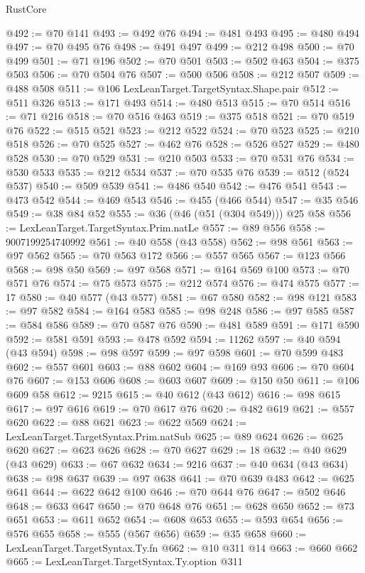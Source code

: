\begin{lexlean}{RustCore}
\begin{coremodule}
@492 := @70 @141
@493 := @492 @76
@494 := @481 @493
@495 := @480 @494
@497 := @70 @495 @76
@498 := @491 @497
@499 := @212 @498
@500 := @70 @499
@501 := @71 @196
@502 := @70 @501
@503 := @502 @463
@504 := @375 @503
@506 := @70 @504 @76
@507 := @500 @506
@508 := @212 @507
@509 := @488 @508
@511 := @106 LexLeanTarget.TargetSyntax.Shape.pair
@512 := @511 @326
@513 := @171 @493
@514 := @480 @513
@515 := @70 @514
@516 := @71 @216
@518 := @70 @516 @463
@519 := @375 @518
@521 := @70 @519 @76
@522 := @515 @521
@523 := @212 @522
@524 := @70 @523
@525 := @210 @518
@526 := @70 @525
@527 := @462 @76
@528 := @526 @527
@529 := @480 @528
@530 := @70 @529
@531 := @210 @503
@533 := @70 @531 @76
@534 := @530 @533
@535 := @212 @534
@537 := @70 @535 @76
@539 := @512 (@524 @537)
@540 := @509 @539
@541 := @486 @540
@542 := @476 @541
@543 := @473 @542
@544 := @469 @543
@546 := @455 (@466 @544)
@547 := @35 @546
@549 := @38 @84 @52
@555 := @36 (@46 (@51 (@304 @549))) @25 @58
@556 := LexLeanTarget.TargetSyntax.Prim.natLe
@557 := @89 @556
@558 := 9007199254740992
@561 := @40 @558 (@43 @558)
@562 := @98 @561
@563 := @97 @562
@565 := @70 @563 @172
@566 := @557 @565
@567 := @123 @566
@568 := @98 @50
@569 := @97 @568
@571 := @164 @569 @100
@573 := @70 @571 @76
@574 := @75 @573
@575 := @212 @574
@576 := @474 @575
@577 := 17
@580 := @40 @577 (@43 @577)
@581 := @67 @580
@582 := @98 @121
@583 := @97 @582
@584 := @164 @583
@585 := @98 @248
@586 := @97 @585
@587 := @584 @586
@589 := @70 @587 @76
@590 := @481 @589
@591 := @171 @590
@592 := @581 @591
@593 := @478 @592
@594 := 11262
@597 := @40 @594 (@43 @594)
@598 := @98 @597
@599 := @97 @598
@601 := @70 @599 @483
@602 := @557 @601
@603 := @88 @602
@604 := @169 @93
@606 := @70 @604 @76
@607 := @153 @606
@608 := @603 @607
@609 := @150 @50
@611 := @106 @609 @58
@612 := 9215
@615 := @40 @612 (@43 @612)
@616 := @98 @615
@617 := @97 @616
@619 := @70 @617 @76
@620 := @482 @619
@621 := @557 @620
@622 := @88 @621
@623 := @622 @569
@624 := LexLeanTarget.TargetSyntax.Prim.natSub
@625 := @89 @624
@626 := @625 @620
@627 := @623 @626
@628 := @70 @627
@629 := 18
@632 := @40 @629 (@43 @629)
@633 := @67 @632
@634 := 9216
@637 := @40 @634 (@43 @634)
@638 := @98 @637
@639 := @97 @638
@641 := @70 @639 @483
@642 := @625 @641
@644 := @622 @642 @100
@646 := @70 @644 @76
@647 := @502 @646
@648 := @633 @647
@650 := @70 @648 @76
@651 := @628 @650
@652 := @73 @651
@653 := @611 @652
@654 := @608 @653
@655 := @593 @654
@656 := @576 @655
@658 := @555 (@567 @656)
@659 := @35 @658
@660 := LexLeanTarget.TargetSyntax.Ty.fn
@662 := @10 @311 @14
@663 := @660 @662
@665 := LexLeanTarget.TargetSyntax.Ty.option @311

\end{coremodule}
\end{lexlean}
